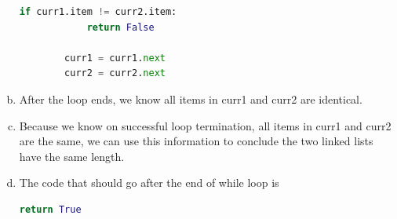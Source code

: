 \documentclass[12pt]{article}
\begin{document}
\begin{enumerate}[a.]
\begin{lstlisting}[language=Python]
        if curr1.item != curr2.item:
            return False

        curr1 = curr1.next
        curr2 = curr2.next
    \end{lstlisting}

    \item

    After the loop ends, we know all items in curr1 and curr2 are identical.

    \item

    Because we know on successful loop termination, all items in curr1 and curr2
    are the same, we can use this information to conclude the two linked lists
    have the same length.

    \item

    The code that should go after the end of while loop is

    \begin{lstlisting}[language=Python]
    return True
    \end{lstlisting}

\end{enumerate}
\end{document}
